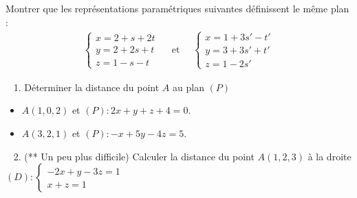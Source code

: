 \documentclass[letterpaper,10pt,english]{jupyterBook}
\begin{document}
\sphinxAtStartPar
{} Montrer que les représentations paramétriques suivantes
définissent le même plan :
\begin{equation*}
\begin{split}
\left\{ \begin{array}{l}x=2+s+2t \\ y=2+2s+t \\ z=1-s-t \end{array} \right.
\quad \text{ et } \quad  \left\{ \begin{array}{l} x=1+3s'-t'\\ y=3+3s'+t'\\ z=1-2s' \end{array} \right.
\end{split}
\end{equation*}
\sphinxAtStartPar
{}

\sphinxAtStartPar
  1. Déterminer la distance du point \(A\) au plan \((P)\)
\begin{itemize}
\item {} 
\sphinxAtStartPar
\(A(1,0,2)\) et \((P): 2x+y+z+4=0\).

\item {} 
\sphinxAtStartPar
\(A(3,2,1)\) et \((P): -x+5y-4z=5\).

\end{itemize}

\sphinxAtStartPar
  2. (** Un peu plus difficile) Calculer la distance du point \(A(1,2,3)\) à la droite
\((D):  \left\{ \begin{array}{l}
-2x+y-3z=1\\ x+z=1  \end{array} \right.\)







\renewcommand{\indexname}{Index}
\printindex
\end{document}
